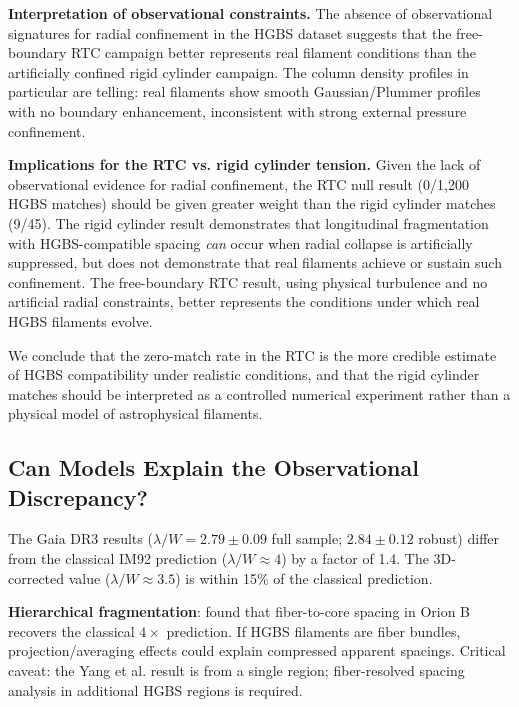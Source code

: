 \documentclass[twocolumn]{mnras}
\begin{document}
\textbf{Interpretation of observational constraints.}
The absence of observational signatures for radial confinement in the HGBS dataset suggests that the free-boundary RTC campaign better represents real filament conditions than the artificially confined rigid cylinder campaign. The column density profiles in particular are telling: real filaments show smooth Gaussian/Plummer profiles with no boundary enhancement, inconsistent with strong external pressure confinement.

\textbf{Implications for the RTC vs. rigid cylinder tension.}
Given the lack of observational evidence for radial confinement, the RTC null result (0/1,200 HGBS matches) should be given greater weight than the rigid cylinder matches (9/45). The rigid cylinder result demonstrates that longitudinal fragmentation with HGBS-compatible spacing \textit{can} occur when radial collapse is artificially suppressed, but does not demonstrate that real filaments achieve or sustain such confinement. The free-boundary RTC result, using physical turbulence and no artificial radial constraints, better represents the conditions under which real HGBS filaments evolve.

We conclude that the zero-match rate in the RTC is the more credible estimate of HGBS compatibility under realistic conditions, and that the rigid cylinder matches should be interpreted as a controlled numerical experiment rather than a physical model of astrophysical filaments.

\subsection{Can Models Explain the Observational Discrepancy?}

The Gaia DR3 results ($\lambda/W = 2.79 \pm 0.09$ full sample; $2.84 \pm 0.12$ robust) differ from the classical IM92 prediction ($\lambda/W \approx 4$) by a factor of 1.4. The 3D-corrected value ($\lambda/W \approx 3.5$) is within 15\% of the classical prediction.

\textbf{Hierarchical fragmentation}: \citet{Yang2024} found that fiber-to-core spacing in Orion B recovers the classical $4\times$ prediction. If HGBS filaments are fiber bundles, projection/averaging effects could explain compressed apparent spacings. Critical caveat: the Yang et al. result is from a single region; fiber-resolved spacing analysis in additional HGBS regions is required.
\end{document}
